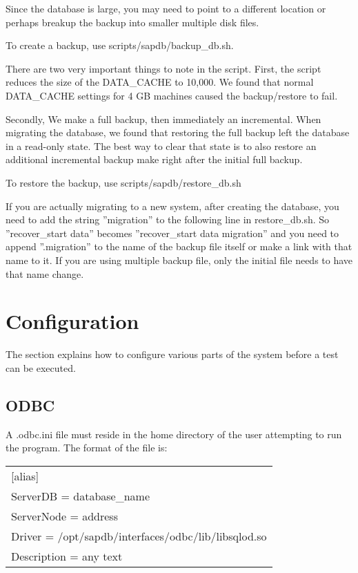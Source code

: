 \documentclass{article}
\begin{document}
Since the database is large, you may need to point to a different location or
perhaps breakup the backup into smaller multiple disk files. 

To create a backup, use scripts/sapdb/backup\_db.sh.

There are two very important things to note in the script.  First, the script
reduces the size of the DATA\_CACHE to 10,000.   We found that normal
DATA\_CACHE settings for 4 GB machines caused the backup/restore to fail.

Secondly, We make a full backup, then immediately an incremental.  When
migrating the database, we found that restoring the full backup left the
database in a read-only state.  The best way to clear that state is to also
restore an additional incremental backup make right after the initial full
backup.

To restore the backup, use scripts/sapdb/restore\_db.sh

If you are actually migrating to a new system, after creating the database,
you need to add the string ''migration'' to the following line in
restore\_db.sh.  So ''recover\_start data'' becomes
''recover\_start data migration'' and you need to append ''.migration'' to
the name of the backup file itself or make a link with that name to it.  If
you are using multiple backup file, only the initial file needs to have that
name change.

\section{Configuration}

The section explains how to configure various parts of the system before a
test can be executed.

\subsection{ODBC}

A .odbc.ini file must reside in the home directory of the user
attempting to run the program.  The format of the file is: \\
\begin{tabular}[c]{l}
[alias] \\
ServerDB = database\_name \\
ServerNode = address \\
Driver = /opt/sapdb/interfaces/odbc/lib/libsqlod.so \\
Description = any text \\
\end{tabular}
\end{document}
